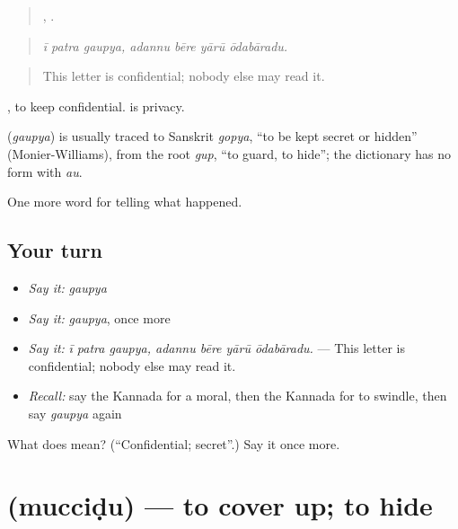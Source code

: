 \begin{quote}
  ,    .
\end{quote}

\begin{quote}
\emph{ī patra gaupya, adannu bēre yārū ōdabāradu.}
\end{quote}

\begin{quote}
This letter is confidential; nobody else may read it.
\end{quote}

 , to keep confidential.  is privacy.

\begin{cousinweb}
\textbf{} (\emph{gaupya}) is usually traced to Sanskrit \emph{gopya}, \textquotedblleft{}to be kept secret or hidden\textquotedblright{} (Monier-Williams), from the root \emph{gup}, \textquotedblleft{}to guard, to hide\textquotedblright{}; the dictionary has no form with \emph{au}.
\end{cousinweb}

\begin{grammarlens}[title={What you've built}]
One more word for telling what happened.
\end{grammarlens}

\subsection*{Your turn}
\begin{itemize}
\raggedright
  \item \emph{Say it:} \emph{gaupya}
  \item \emph{Say it:} \emph{gaupya}, once more
  \item \emph{Say it:} \emph{ī patra gaupya, adannu bēre yārū ōdabāradu.} — This letter is confidential; nobody else may read it.
  \item \emph{Recall:} say the Kannada for a moral, then the Kannada for to swindle, then say \emph{gaupya} again
\end{itemize}

\begin{tcolorbox}[breakable,colback=teal!4,colframe=teal!35!black,title={Before you move on}]
What does  mean? (\textquotedblleft{}Confidential; secret\textquotedblright{}.) Say it once more.
\end{tcolorbox}
\section[\texorpdfstring{\kn{ಮುಚ್ಚಿಡು} (mucciḍu)}{ಮುಚ್ಚಿಡು (mucciḍu)}]{ (mucciḍu) — to cover up; to hide}

